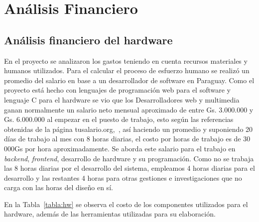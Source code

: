 \section[Análisis Financiero]{Análisis Financiero}

\subsection{Análisis financiero del hardware}
En el proyecto se analizaron los gastos teniendo en cuenta  recursos materiales y humanos utilizados. 
Para el calcular el proceso de esfuerzo humano se realizó un promedio del salario en base a un desarrollador de software en Paraguay. 
Como el proyecto está hecho con lenguajes de programación web para el software y lenguaje C para el hardware se vio que los Desarrolladores web y multimedia ganan normalmente un salario neto mensual aproximado de entre Gs. 3.000.000 y Gs. 6.000.000 al empezar en el puesto de trabajo, esto según las referencias obtenidas de la página tusalario.org,~\cite{tusalario}, así haciendo un promedio y suponiendo 20 días de trabajo al mes con 8 horas diarias, el costo por horas de trabajo es de 30 000Gs por hora aproximadamente. 
Se aborda este salario para el trabajo en \textit{backend}, \textit{frontend}, desarrollo de hardware y su programación. 
Como no se trabaja las 8 horas diarias por el desarrollo del sistema, empleamos 4 horas diarias para el desarrollo y las restantes 4 horas para otras gestiones e investigaciones que no carga con las horas del diseño en sí. 

En la Tabla~\ref{tabla:hw} se observa el costo de los componentes utilizados para el hardware, además de las herramientas utilizadas para su elaboración. 


